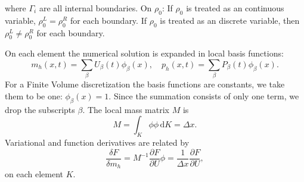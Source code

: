 \documentclass{article}
\begin{document}
where $\Gamma_i$ are all internal boundaries. On $\rho_0$: If $\rho_0$ is treated as an continuous variable, $\rho_0^L = \rho_0^R$ for each boundary. If $\rho_0$ is treated as an discrete variable, then $\rho_0^L \neq \rho_0^R$ for each boundary.

On each element the numerical solution is expanded in local basis functions:
\begin{equation}
		m_h(x,t) = \sum_\beta U_\beta (t) \phi_\beta(x), \quad
		p_h(x,t) = \sum_\beta P_\beta (t) \phi_\beta(x).
\end{equation}
For a Finite Volume discretization the basis functions are constants, we take them to be one: $\phi_\beta(x) = 1$. Since the summation consists of only one term, we drop the subscripts $\beta$. The local mass matrix $M$ is
\begin{equation}
	M = \int_K \! \phi \phi \, \mathrm{d}K = \Delta x.
\end{equation}
Variational and function derivatives are related by
\begin{equation}
	\frac{\delta F}{\delta m_h} = M^{-1} \frac{\partial F}{\partial U} \phi = \frac{1}{\Delta x} \frac{\partial F}{\partial U},
\end{equation}
on each element $K$. 
\end{document}
